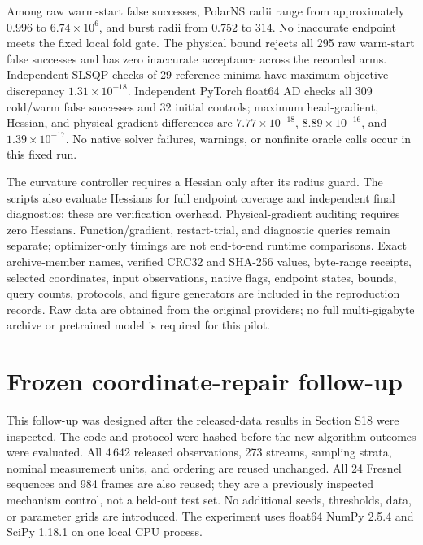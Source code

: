 \documentclass[10pt,a4paper]{article}
\begin{document}
Among raw warm-start false successes, PolarNS radii range from approximately $0.996$ to $6.74\times10^6$, and burst radii from $0.752$ to $314$. No inaccurate endpoint meets the fixed local fold gate. The physical bound rejects all 295 raw warm-start false successes and has zero inaccurate acceptance across the recorded arms. Independent SLSQP checks of 29 reference minima have maximum objective discrepancy $1.31\times10^{-18}$. Independent PyTorch float64 AD checks all 309 cold/warm false successes and 32 initial controls; maximum head-gradient, Hessian, and physical-gradient differences are $7.77\times10^{-18}$, $8.89\times10^{-16}$, and $1.39\times10^{-17}$. No native solver failures, warnings, or nonfinite oracle calls occur in this fixed run.

The curvature controller requires a Hessian only after its radius guard. The scripts also evaluate Hessians for full endpoint coverage and independent final diagnostics; these are verification overhead. Physical-gradient auditing requires zero Hessians. Function/gradient, restart-trial, and diagnostic queries remain separate; optimizer-only timings are not end-to-end runtime comparisons. Exact archive-member names, verified CRC32 and SHA-256 values, byte-range receipts, selected coordinates, input observations, native flags, endpoint states, bounds, query counts, protocols, and figure generators are included in the reproduction records. Raw data are obtained from the original providers; no full multi-gigabyte archive or pretrained model is required for this pilot.


\section{Frozen coordinate-repair follow-up}
\label{sec:schartrepair}
This follow-up was designed after the released-data results in Section S18 were inspected. The code and protocol were hashed before the new algorithm outcomes were evaluated. All 4\,642 released observations, 273 streams, sampling strata, nominal measurement units, and ordering are reused unchanged. All 24 Fresnel sequences and 984 frames are also reused; they are a previously inspected mechanism control, not a held-out test set. No additional seeds, thresholds, data, or parameter grids are introduced. The experiment uses float64 NumPy 2.5.4 and SciPy 1.18.1 on one local CPU process.
\end{document}
